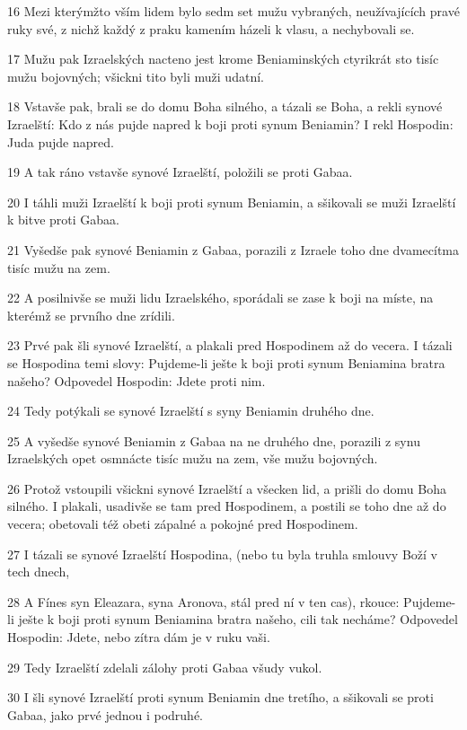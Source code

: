 \par 16 Mezi kterýmžto vším lidem bylo sedm set mužu vybraných, neužívajících pravé ruky své, z nichž každý z praku kamením házeli k vlasu, a nechybovali se.
\par 17 Mužu pak Izraelských nacteno jest krome Beniaminských ctyrikrát sto tisíc mužu bojovných; všickni tito byli muži udatní.
\par 18 Vstavše pak, brali se do domu Boha silného, a tázali se Boha, a rekli synové Izraelští: Kdo z nás pujde napred k boji proti synum Beniamin? I rekl Hospodin: Juda pujde napred.
\par 19 A tak ráno vstavše synové Izraelští, položili se proti Gabaa.
\par 20 I táhli muži Izraelští k boji proti synum Beniamin, a sšikovali se muži Izraelští k bitve proti Gabaa.
\par 21 Vyšedše pak synové Beniamin z Gabaa, porazili z Izraele toho dne dvamecítma tisíc mužu na zem.
\par 22 A posilnivše se muži lidu Izraelského, sporádali se zase k boji na míste, na kterémž se prvního dne zrídili.
\par 23 Prvé pak šli synové Izraelští, a plakali pred Hospodinem až do vecera. I tázali se Hospodina temi slovy: Pujdeme-li ješte k boji proti synum Beniamina bratra našeho? Odpovedel Hospodin: Jdete proti nim.
\par 24 Tedy potýkali se synové Izraelští s syny Beniamin druhého dne.
\par 25 A vyšedše synové Beniamin z Gabaa na ne druhého dne, porazili z synu Izraelských opet osmnácte tisíc mužu na zem, vše mužu bojovných.
\par 26 Protož vstoupili všickni synové Izraelští a všecken lid, a prišli do domu Boha silného. I plakali, usadivše se tam pred Hospodinem, a postili se toho dne až do vecera; obetovali též obeti zápalné a pokojné pred Hospodinem.
\par 27 I tázali se synové Izraelští Hospodina, (nebo tu byla truhla smlouvy Boží v tech dnech,
\par 28 A Fínes syn Eleazara, syna Aronova, stál pred ní v ten cas), rkouce: Pujdeme-li ješte k boji proti synum Beniamina bratra našeho, cili tak necháme? Odpovedel Hospodin: Jdete, nebo zítra dám je v ruku vaši.
\par 29 Tedy Izraelští zdelali zálohy proti Gabaa všudy vukol.
\par 30 I šli synové Izraelští proti synum Beniamin dne tretího, a sšikovali se proti Gabaa, jako prvé jednou i podruhé.
